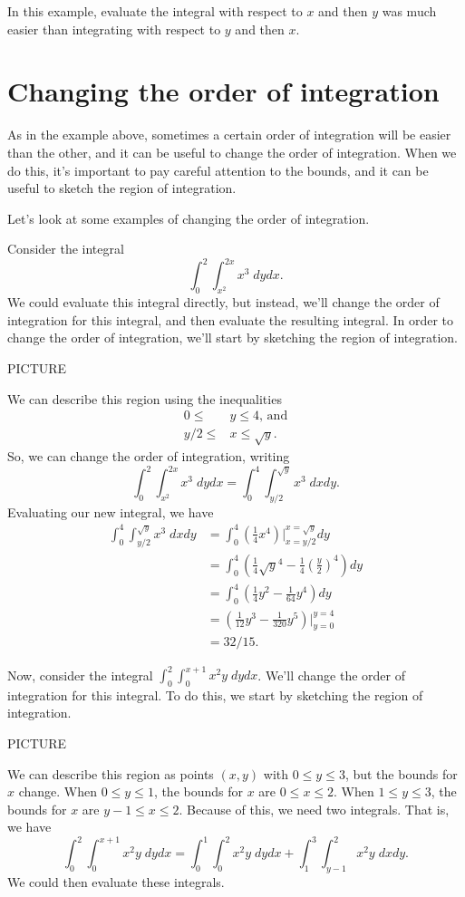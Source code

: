 \documentclass{ximera}
\begin{document}
In this example, evaluate the integral with respect to $x$ and then $y$ was much easier than integrating with respect to $y$ and then $x$.

\section*{Changing the order of integration}

As in the example above, sometimes a certain order of integration will be easier than the other, and it can be useful to change the order of integration. When we do this, it's important to pay careful attention to the bounds, and it can be useful to sketch the region of integration.

Let's look at some examples of changing the order of integration.

\begin{example}
Consider the integral
\[
\int_0^2\int_{x^2}^{2x} x^3\;dydx.
\]
We could evaluate this integral directly, but instead, we'll change the order of integration for this integral, and then evaluate the resulting integral. In order to change the order of integration, we'll start by sketching the region of integration.

PICTURE

We can describe this region using the inequalities
\begin{align*}
0\leq &y\leq 4\text{, and}\\
y/2 \leq &x\leq \sqrt{y}.
\end{align*}
So, we can change the order of integration, writing
\[
\int_0^2\int_{x^2}^{2x} x^3\;dydx = \int_0^4\int_{y/2}^{\sqrt{y}}x^3\;dxdy.
\]
Evaluating our new integral, we have
\begin{align*}
\int_0^4\int_{y/2}^{\sqrt{y}}x^3\;dxdy &= \int_0^4\left(\frac{1}{4}x^4\right)|_{x=y/2}^{x=\sqrt{y}}dy\\
&= \int_0^4\left(\frac{1}{4}\sqrt{y}^4 - \frac{1}{4}\left(\frac{y}{2}\right)^4\right)dy\\
&= \int_0^4\left(\frac{1}{4}y^2 - \frac{1}{64}y^4\right)dy\\
&= \left(\frac{1}{12}y^3 - \frac{1}{320}y^5\right)|_{y=0}^{y=4}\\
&= 32/15.
\end{align*}
\end{example}

\begin{example}
Now, consider the integral $\int_0^2\int_0^{x+1}x^2y\;dydx$. We'll change the order of integration for this integral. To do this, we start by sketching the region of integration.

PICTURE

We can describe this region as points $(x,y)$ with $0\leq y\leq 3$, but the bounds for $x$ change. When $0\leq y\leq 1$, the bounds for $x$ are $0\leq x\leq 2$. When $1 \leq y\leq 3$, the bounds for $x$ are $y-1\leq x\leq 2$. Because of this, we need two integrals. That is, we have
\[
\int_0^2\int_0^{x+1}x^2y\;dydx = \int_0^1\int_0^2 x^2y\;dydx + \int_1^3\int_{y-1}^2 x^2y\;dxdy.
\]
We could then evaluate these integrals.
\end{example}
\end{document}
